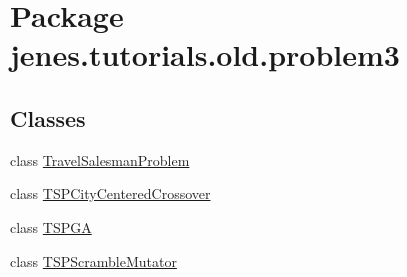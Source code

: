 \hypertarget{namespacejenes_1_1tutorials_1_1old_1_1problem3}{\section{Package jenes.\-tutorials.\-old.\-problem3}
\label{namespacejenes_1_1tutorials_1_1old_1_1problem3}
}
\subsection*{Classes}
\begin{DoxyCompactItemize}
\item 
class \hyperlink{classjenes_1_1tutorials_1_1old_1_1problem3_1_1_travel_salesman_problem}{Travel\-Salesman\-Problem}
\item 
class \hyperlink{classjenes_1_1tutorials_1_1old_1_1problem3_1_1_t_s_p_city_centered_crossover}{T\-S\-P\-City\-Centered\-Crossover}
\item 
class \hyperlink{classjenes_1_1tutorials_1_1old_1_1problem3_1_1_t_s_p_g_a}{T\-S\-P\-G\-A}
\item 
class \hyperlink{classjenes_1_1tutorials_1_1old_1_1problem3_1_1_t_s_p_scramble_mutator}{T\-S\-P\-Scramble\-Mutator}
\end{DoxyCompactItemize}
